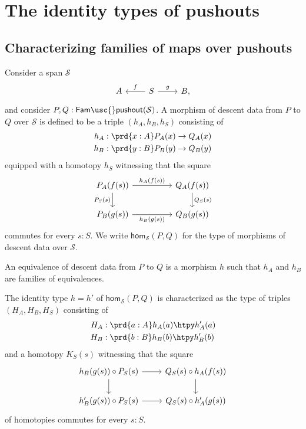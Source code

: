 \section{The identity types of pushouts}

\subsection{Characterizing families of maps over pushouts}
  
\begin{defn}
    Consider a span $\mathcal{S}$
  \begin{equation*}
    \begin{tikzcd}
      A & S \arrow[l,swap,"f"] \arrow[r,"g"] & B,
    \end{tikzcd}
  \end{equation*}
  and consider $P,Q:\mathsf{Fam\usc{}pushout}(\mathcal{S})$.
  A morphism of descent data from $P$ to $Q$ over $\mathcal{S}$ is defined to be a triple $(h_A,h_B,h_S)$ consisting of
  \begin{align*}
    h_A & : \prd{x:A} P_A(x)\to Q_A(x) \\
    h_B & : \prd{y:B} P_B(y)\to Q_B(y)
  \end{align*}
  equipped with a homotopy $h_S$ witnessing that the square
  \begin{equation*}
    \begin{tikzcd}[column sep=huge]
      P_A(f(s)) \arrow[r,"h_A(f(s))"] \arrow[d,swap,"P_S(s)"] & Q_A(f(s)) \arrow[d,"Q_S(s)"] \\
      P_B(g(s)) \arrow[r,swap,"h_B(g(s))"] & Q_B(g(s))
    \end{tikzcd}
  \end{equation*}
  commutes for every $s:S$. We write $\mathsf{hom}_{\mathcal{S}}(P,Q)$ for the type of morphisms of descent data over $\mathcal{S}$.

  An equivalence of descent data from $P$ to $Q$ is a morphism $h$ such that $h_A$ and $h_B$ are families of equivalences.
\end{defn}

\begin{rmk}\label{rmk:id-hom-Fam-pushout}
  The identity type $h=h'$ of $\mathsf{hom}_{\mathcal{S}}(P,Q)$ is characterized as the type of triples $(H_A,H_B,H_S)$ consisting of
  \begin{align*}
    H_A & : \prd{a:A} h_A(a)\htpy h'_A(a) \\
    H_B & : \prd{b:B} h_B(b)\htpy h'_B(b)
  \end{align*}
  and a homotopy $K_S(s)$ witnessing that the square
  \begin{equation*}
    \begin{tikzcd}
      h_B(g(s))\circ P_S(s) \arrow[d] \arrow[r] & Q_S(s)\circ h_A(f(s)) \arrow[d] \\
      h'_B(g(s))\circ P_S(s) \arrow[r] & Q_S(s)\circ h'_A(g(s))
    \end{tikzcd}
  \end{equation*}
  of homotopies commutes for every $s:S$.
\end{rmk}

